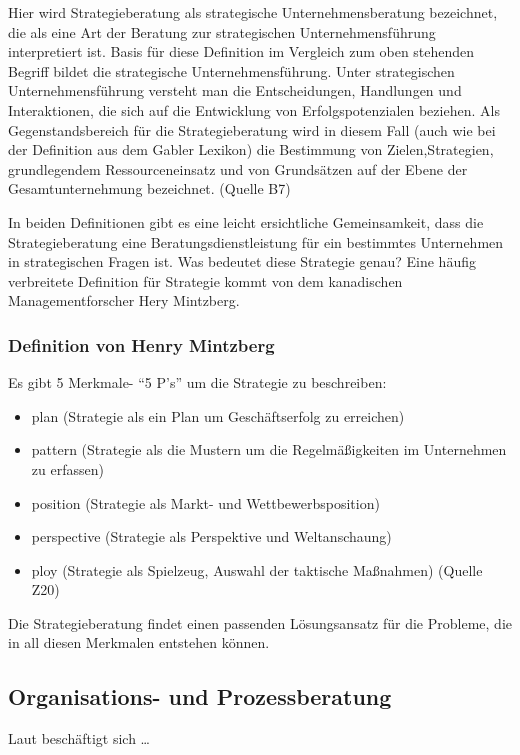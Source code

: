 Hier wird Strategieberatung als strategische Unternehmensberatung bezeichnet, die als eine Art der Beratung zur strategischen Unternehmensführung interpretiert ist. Basis für diese Definition im Vergleich zum oben stehenden Begriff bildet die strategische Unternehmensführung. Unter strategischen Unternehmensführung versteht man die Entscheidungen, Handlungen und Interaktionen, die sich auf die Entwicklung von Erfolgspotenzialen beziehen.
Als Gegenstandsbereich für die Strategieberatung wird in diesem Fall (auch wie bei der Definition aus dem Gabler Lexikon) die Bestimmung von Zielen,Strategien, grundlegendem Ressourceneinsatz und von Grundsätzen auf der Ebene der Gesamtunternehmung bezeichnet. 
(Quelle B7)

In beiden Definitionen gibt es eine leicht ersichtliche  Gemeinsamkeit, dass die Strategieberatung eine Beratungsdienstleistung für ein bestimmtes Unternehmen in strategischen Fragen ist. 
Was bedeutet diese Strategie genau? Eine häufig verbreitete Definition für Strategie kommt von dem kanadischen Managementforscher Hery Mintzberg.


\subsubsection{Definition von Henry Mintzberg}

Es gibt 5 Merkmale- “5 P’s”  um die Strategie zu beschreiben:
\begin{itemize}

\item plan (Strategie als ein Plan um Geschäftserfolg zu erreichen)
\item pattern (Strategie als die Mustern um die Regelmäßigkeiten im Unternehmen zu erfassen)
\item position (Strategie als Markt- und Wettbewerbsposition)
\item perspective (Strategie als Perspektive und Weltanschaung)
\item ploy (Strategie als Spielzeug, Auswahl der taktische Maßnahmen) (Quelle Z20)

\end{itemize}

Die Strategieberatung findet einen passenden Lösungsansatz für die Probleme, die in all diesen Merkmalen  entstehen können.


\subsection{Organisations- und Prozessberatung}
Laut \cite{Lippold201309} beschäftigt sich \ldots

